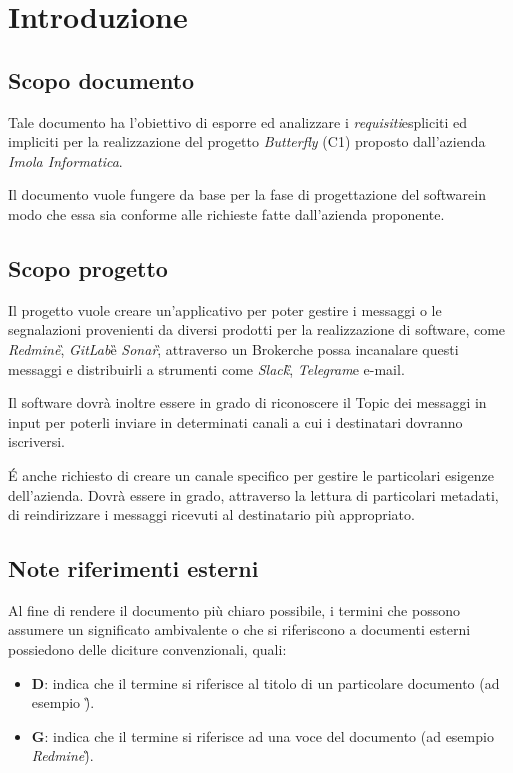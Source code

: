 \section{Introduzione}

	\subsection{Scopo documento}
	Tale documento ha l'obiettivo di esporre ed analizzare i \textit{requisiti}\GAlt espliciti ed impliciti per la realizzazione del progetto \textit{Butterfly} (C1) proposto dall'azienda \textit{Imola Informatica}.
	
	Il documento vuole fungere da base per la fase di progettazione del software\GAlt in modo che essa sia conforme alle richieste fatte dall'azienda proponente.
	
	\subsection{Scopo progetto}
	Il progetto vuole creare un'applicativo per poter gestire i messaggi o le segnalazioni provenienti da diversi prodotti per la realizzazione di software, come \textit{Redmine}\G, \textit{GitLab}\G e \textit{Sonar}\G, attraverso un Broker\GAlt che possa incanalare questi messaggi e distribuirli a strumenti come \textit{Slack}\G, \textit{Telegram}\GAlt e e-mail.
	
	Il software dovrà inoltre essere in grado di riconoscere il Topic dei messaggi in input per poterli inviare in determinati canali a cui i destinatari dovranno iscriversi.
	
	\'E anche richiesto di creare un canale specifico per gestire le particolari esigenze dell'azienda. Dovrà essere in grado, attraverso la lettura di particolari metadati\GAlt, di reindirizzare i messaggi ricevuti al destinatario più appropriato.
	
	\subsection{Note riferimenti esterni}
	Al fine di rendere il documento più chiaro possibile, i termini che possono assumere un significato ambivalente o che si riferiscono a documenti esterni possiedono delle diciture convenzionali, quali:
	
	\begin{itemize}
		\item \textbf{D}: indica che il termine si riferisce al titolo di un particolare documento (ad esempio \textit{\PdPv}\G).
		\item \textbf{G}: indica che il termine si riferisce ad una voce del documento \textit{\Gl} (ad esempio \textit{Redmine}\G).
	\end{itemize}

